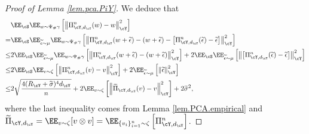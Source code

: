 \documentclass[11pt]{article} %
\begin{document}
\begin{proof}[Proof of Lemma \ref{lem.pca.PiY}]
	We deduce that
	\begin{align}
		&\EE_{\cS}\EE_{w\sim \Psi_{\#}\gamma} \left[ \left\|\Pi_{\cY,d_{\cY}}^n(w)-w\right\|_{\cY}^2 \right]\nonumber\\
		=&\EE_{\cS}\EE_{\widetilde{\epsilon}\sim \mu}\EE_{w\sim \Psi_{\#}\gamma} \left[\left\|\Pi_{\cY,d_{\cY}}^n(w+\widetilde{\epsilon})-(w+\widetilde{\epsilon})-\left[\Pi_{\cY,d_{\cY}}^n(\widetilde{\epsilon})-\widetilde{\epsilon} \right]\right\|_{\cY}^2\right] \nonumber\\
		\leq & 2\EE_{\cS}\EE_{\widetilde{\epsilon}\sim \mu}\EE_{w\sim \Psi_{\#}\gamma} \left[\left\|\Pi_{\cY,d_{\cY}}^n(w+\widetilde{\epsilon})-(w+\widetilde{\epsilon})\right\|_{\cY}^2\right]+ 2 \EE_{\cS}\EE_{\widetilde{\epsilon}\sim \mu} \left[\left\|\left[\Pi_{\cY,d_{\cY}}^n(\widetilde{\epsilon})-\widetilde{\epsilon} \right]\right\|_{\cY}^2 \right]\nonumber\\
		\leq &2\EE_{\cS}\EE_{v\sim \zeta} \left[\left\|\Pi_{\cY,d_{\cY}}^n(v)-v\right\|_{\cY}^2\right]+2\EE_{\widetilde{\epsilon} \sim \mu}\left[\left\|\widetilde{\epsilon}\right\|_{\cY}^2 \right] \nonumber\\
		\leq &  2\sqrt{\frac{4(R_{\cY}+\widetilde{\sigma})^4d_{\cY}}{n}}+2\EE_{v\sim \zeta} \left[\left\|\widetilde{\Pi}_{\cY,d_{\cY}}(v)-v\right\|_{\cY}^2\right] +2\widetilde{\sigma}^2,
		\label{eq.PCA.errorY}
	\end{align}
	where the last inequality comes from Lemma \ref{lem.PCA.empirical} and $\widetilde{\Pi}_{\cY,d_{\cY}}=\EE_{v\sim \zeta} [v\otimes v]= \EE_{\{v_i\}_{i=1}^n\sim \zeta}\left[ \Pi_{\cY,d_{\cY}}^n\right]$.
	

\end{proof}
\end{document}
